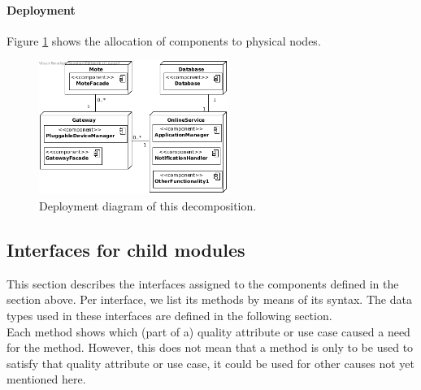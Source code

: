 
    \paragraph{Deployment}
        Figure \ref{fig:it1-depl_main} shows the allocation of components
        to physical nodes.

        \begin{figure}[!htp]
        	\centering
        	\includegraphics[width=0.55\textwidth]{images/deployment-diagram-1}
        	\caption{Deployment diagram of this decomposition.}\label{fig:it1-depl_main}
        \end{figure}


\subsection{Interfaces for child modules}\label{add1-interfaces}
    This section describes the interfaces assigned to the components defined
    in the section above. Per interface, we list its methods by means of its
    syntax. The data types used in these interfaces are defined in the following section. \\

    Each method shows which (part of a) quality attribute or use case caused
    a need for the method. However, this does not mean that a method is
    only to be used to satisfy that quality attribute or use case, it could
    be used for other causes not yet mentioned here.

